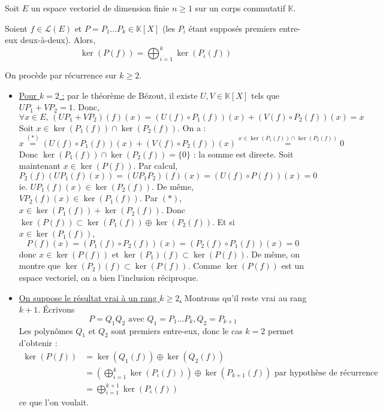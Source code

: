 





	Soit $E$ un espace vectoriel de dimension finie $n \geq 1$ sur un corps commutatif $\mathbb{K}$.

	\begin{lemma}
		\label{lemme-des-noyaux-1}
		Soient $f \in \mathcal{L}(E)$ et $P = P_1 \dots P_k \in \mathbb{K}[X]$ (les $P_i$ étant supposés premiers entre-eux deux-à-deux). Alors,
		\[ \ker(P(f)) = \bigoplus_{i = 1}^k \ker(P_i(f)) \]
	\end{lemma}

	\begin{demonstration}
		On procède par récurrence sur $k \geq 2$.
		\begin{itemize}
			\item \uline{Pour $k = 2$ :} par le théorème de Bézout, il existe $U, V \in \mathbb{K}[X]$ tels que $UP_1 + VP_2 = 1$. Donc,
			\[ \forall x \in E, \, (UP_1 + VP_2)(f)(x) = (U(f) \circ P_1(f))(x) + (V(f) \circ P_2(f))(x) = x \tag{$*$} \]
			Soit $x \in \ker(P_1(f)) \cap \ker(P_2(f))$. On a :
			\[ x \overset{(*)}{=} (U(f) \circ P_1(f))(x) + (V(f) \circ P_2(f))(x) \overset{x \in \ker(P_1(f)) \cap \ker(P_2(f))}{=} 0 \]
			Donc $\ker(P_1(f)) \cap \ker(P_2(f)) = \{ 0 \}$ : la somme est directe.
			\newpar
			Soit maintenant $x \in \ker(P(f))$. Par calcul,
			\[ P_2(f)(UP_1(f)(x)) = (UP_1P_2)(f)(x) = (U(f) \circ P(f))(x) = 0 \]
			ie. $UP_1(f)(x) \in \ker(P_2(f))$. De même, $VP_2(f)(x) \in \ker(P_1(f))$. Par $(*)$, $x \in \ker(P_1(f)) + \ker(P_2(f))$. Donc $\ker(P(f)) \subset \ker(P_1(f)) \oplus \ker(P_2(f))$.
			\newpar
			Et si $x \in \ker(P_1(f))$,
			\[ P(f)(x) = (P_1(f) \circ P_2(f))(x) = (P_2(f) \circ P_1(f))(x) = 0 \]
			donc $x \in \ker(P(f))$ et $\ker(P_1)(f) \subset \ker(P(f))$. De même, on montre que $\ker(P_2)(f) \subset \ker(P(f))$. Comme $\ker(P(f))$ est un espace vectoriel, on a bien l'inclusion réciproque.
			\item \uline{On suppose le résultat vrai à un rang $k \geq 2$.} Montrons qu'il reste vrai au rang $k+1$. Écrivons
			\[ P = Q_1Q_2 \text{ avec } Q_1 = P_1 \dots P_k, Q_2 = P_{k+1} \]
			Les polynômes $Q_1$ et $Q_2$ sont premiers entre-eux, donc le cas $k = 2$ permet d'obtenir :
			\begin{align*}
				\ker(P(f)) &= \ker(Q_1(f)) \oplus \ker(Q_2(f)) \\
				&= \left( \bigoplus_{i = 1}^k \ker(P_i(f)) \right) \oplus \ker(P_{k+1}(f)) \text{ par hypothèse de récurrence} \\
				&= \bigoplus_{i = 1}^{k+1} \ker(P_i(f))
			\end{align*}
			ce que l'on voulait.
		\end{itemize}
	\end{demonstration}

